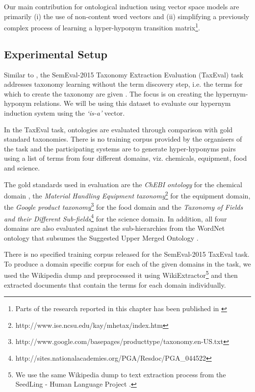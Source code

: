 Our main contribution for ontological induction using vector space models are primarily (i) the use of non-content word vectors and (ii) simplifying a previously complex process of learning a hyper-hyponym transition matrix\footnote{Parts of the research reported in this chapter has been published in \cite{tan-gupta-vangenabith:2015:SemEval}}.

\subsection{Experimental Setup}

Similar to \cite{fountain2012taxonomy}, the SemEval-2015 Taxonomy Extraction Evaluation (TaxEval) task addresses taxonomy learning without the term discovery step, i.e. the terms for which to create the taxonomy are given \citep{task17semeval2015}. The focus is on creating the hypernym-hyponym relations. We will be using this dataset to evaluate our hypernym induction system using the \textit{`is-a'} vector.

In the TaxEval task, ontologies are evaluated through comparison with gold standard taxonomies. There is no training corpus provided by the organisers of the task and the participating systems are to generate hyper-hyponyms pairs using a list of terms from four different domains, viz. chemicals, equipment, food and science. 

The gold standards used in evaluation are the \emph{ChEBI ontology} for the chemical domain \citep{degtyarenko2008chebi}, the \emph{Material Handling Equipment taxonomy}\footnote{http://www.ise.ncsu.edu/kay/mhetax/index.htm} for the equipment domain, the \emph{Google product taxonomy}\footnote{http://www.google.com/basepages/producttype/taxonomy.en-US.txt} for the food domain and the\emph{ Taxonomy of Fields and their Different Sub-fields}\footnote{http://sites.nationalacademies.org/PGA/Resdoc/PGA\_044522} for the science domain. In addition, all four domains are also evaluated against the sub-hierarchies from the WordNet ontology that subsumes the Suggested Upper Merged Ontology \citep{PeaseEtAl2002sumo}.

There is no specified training corpus released for the SemEval-2015 TaxEval task. To produce a domain specific corpus for each of the given domains in the task, we used the Wikipedia dump and preprocessed it using WikiExtractor\footnote{We use the same Wikipedia dump to text extraction process from the SeedLing - Human Language Project \citep{emerson2014}.} and then extracted documents that contain the terms for each domain individually.

